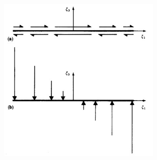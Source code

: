 \documentclass{beamer}
\begin{document}
\begin{frame}
	\begin{figure}[htb]
		\centering
		\includegraphics[width= 8cm, height= 8cm]{forca}
	\end{figure}
\end{frame}
\end{document}
